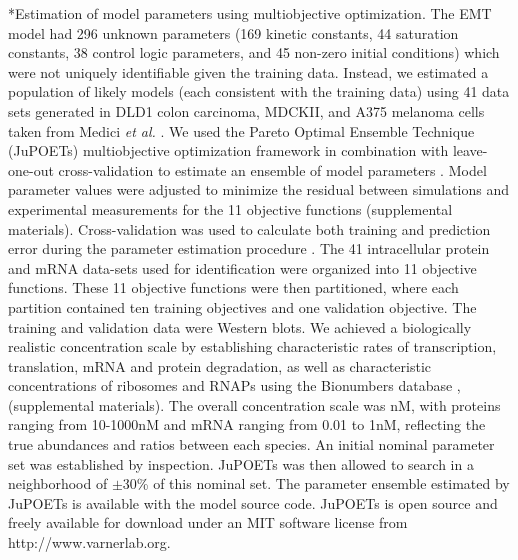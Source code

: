 \documentclass[12pt]{article}
\makeatletter
\renewcommand\subsubsection{\@startsection
	{subsubsection}{2}{0mm}
	{-0.05in}
	{-0.5\baselineskip}
	{\normalfont\normalsize\itshape}}
\makeatother
\begin{document}
\subsubsection*{Estimation of model parameters using multiobjective optimization.}
The EMT model had 296 unknown parameters (169 kinetic constants, 44 saturation constants, 38 control logic parameters, and 45 non-zero initial conditions) which were not uniquely identifiable given the training data.
Instead, we estimated a population of likely models (each consistent with the training data)
using 41 data sets generated in DLD1 colon carcinoma, MDCKII, and A375 melanoma cells taken from Medici \emph{et al.} \citep{Medici:2008fk}.
We used the Pareto Optimal Ensemble Technique (JuPOETs) multiobjective optimization framework in combination
with leave-one-out cross-validation to estimate an ensemble of model parameters \citep{Song:2010fk,JuPOETs-BioArXiv}.
Model parameter values were adjusted to minimize the residual between simulations and experimental measurements for the 11 objective functions (supplemental materials).
Cross-validation was used to calculate both training and prediction error during the parameter estimation procedure \citep{kohavi1995study}.
The 41 intracellular protein and mRNA data-sets used for identification were organized into 11 objective functions.
These 11 objective functions were then partitioned, where each partition contained ten training objectives and one validation objective.
The training and validation data were Western blots. We achieved a biologically realistic concentration scale by establishing characteristic rates of transcription, translation, mRNA and protein degradation, as well as characteristic concentrations of ribosomes and RNAPs using the Bionumbers database \citep{Milo:2010aa}, (supplemental materials).
The overall concentration scale was nM, with proteins ranging from 10-1000nM and mRNA ranging from 0.01 to 1nM, reflecting the true abundances and ratios between each species.
An initial nominal parameter set was established by inspection. JuPOETs was then allowed to search in a neighborhood of $\pm$30\% of this nominal set.
The parameter ensemble estimated by JuPOETs is available with the model source code.
JuPOETs is open source and freely available for download under an MIT software license from http://www.varnerlab.org.
\end{document}
